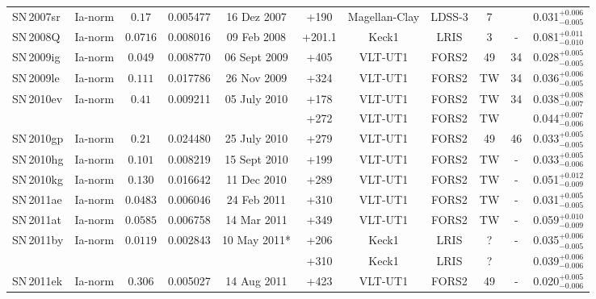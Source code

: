 \documentclass[fleqn,usenatbib]{mnras}
\begin{document}
\begin{table}
{\begin{tabular}{l c c c c c c c c c c}
    SN\,2007sr & Ia-norm   & $0.17$    & 0.005477 & 16 Dez 2007  & +190   & Magellan-Clay & LDSS-3   & 7 &    & 0.031$^{+0.006}_{-0.005}$ \\
    SN\,2008Q  & Ia-norm   & $0.0716$  & 0.008016 & 09 Feb 2008  & +201.1 & Keck1    & LRIS          & 3 & -  & 0.081$^{+0.011}_{-0.010}$ \\
    SN\,2009ig & Ia-norm   & $0.049$   & 0.008770 & 06 Sept 2009 & +405   & VLT-UT1  & FORS2         & 49& 34 & 0.028$^{+0.005}_{-0.005}$ \\
    SN\,2009le & Ia-norm   & $0.111$   & 0.017786 & 26 Nov 2009  & +324   & VLT-UT1  & FORS2         & TW& 34 & 0.036$^{+0.006}_{-0.005}$ \\
    SN\,2010ev & Ia-norm   & $0.41$    & 0.009211 & 05 July 2010 & +178   & VLT-UT1  & FORS2         & TW& 34 & 0.038$^{+0.008}_{-0.007}$ \\
             &           &           &          &              & +272   & VLT-UT1  & FORS2         & TW&    & 0.044$^{+0.007}_{-0.006}$ \\
    SN\,2010gp & Ia-norm   & $0.21$    & 0.024480 & 25 July 2010 & +279   & VLT-UT1  & FORS2         & 49& 46 & 0.033$^{+0.005}_{-0.005}$ \\
    SN\,2010hg & Ia-norm   & $0.101$   & 0.008219 & 15 Sept 2010 & +199   & VLT-UT1  & FORS2         & TW& -  & 0.033$^{+0.005}_{-0.006}$ \\
    SN\,2010kg & Ia-norm   & $0.130$   & 0.016642 & 11 Dec 2010  & +289   & VLT-UT1  & FORS2         & TW& -  & 0.051$^{+0.012}_{-0.009}$ \\  
    SN\,2011ae & Ia-norm   & $0.0483$  & 0.006046 & 24 Feb 2011  & +310   & VLT-UT1  & FORS2         & TW& -  & 0.031$^{+0.005}_{-0.005}$ \\  
    SN\,2011at & Ia-norm   & $0.0585$  & 0.006758 & 14 Mar 2011  & +349   & VLT-UT1  & FORS2         & TW& -  & 0.059$^{+0.010}_{-0.009}$ \\
    SN\,2011by & Ia-norm   & $0.0119$  & 0.002843 & 10 May 2011* & +206   & Keck1    & LRIS          & ? & -  & 0.035$^{+0.006}_{-0.005}$ \\  
             &           &           &          &              & +310   & Keck1    & LRIS          & ? &    & 0.039$^{+0.006}_{-0.006}$ \\
    SN\,2011ek & Ia-norm   & $0.306$   & 0.005027 & 14 Aug 2011  & +423   & VLT-UT1 & FORS2          & 49& -  & 0.020$^{+0.005}_{-0.006}$ \\

\end{tabular}}
\end{table}
\end{document}
